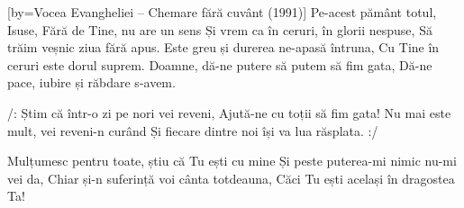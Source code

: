 [by={Vocea Evangheliei -- Chemare fără cuvânt (1991)}]
\beginverse
Pe-acest pământ totul, Isuse,
Fără de Tine, nu are un sens
Și vrem ca în ceruri, în glorii nespuse,
Să trăim veșnic ziua fără apus.
Este greu și durerea ne-apasă întruna,
Cu Tine în ceruri este dorul suprem.
Doamne, dă-ne putere să putem să fim gata,
Dă-ne pace, iubire și răbdare s-avem.
\endverse

\beginchorus
/: Știm că într-o zi pe nori vei reveni,
Ajută-ne cu toții să fim gata!
Nu mai este mult, vei reveni-n curând
Și fiecare dintre noi își va lua răsplata. :/
\endchorus

\beginverse
Mulțumesc pentru toate, știu că Tu ești cu mine
Și peste puterea-mi nimic nu-mi vei da,
Chiar și-n suferință voi cânta totdeauna,
Căci Tu ești același în dragostea Ta!
\endverse
\endsong